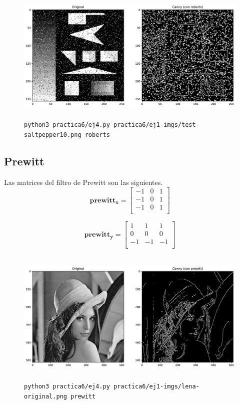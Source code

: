 \documentclass[11pt, spanish]{article}
\begin{document}
\begin{figure}[H]
\centering
    \includegraphics[height=6.5cm]{informe-imgs/ej4-roberts-test-saltpepper10.jpg}
    \caption{\texttt{python3 practica6/ej4.py practica6/ej1-imgs/test-saltpepper10.png roberts}}
\end{figure}


\newpage
\subsection{Prewitt}
Las matrices del filtro de Prewitt son las siguientes.
\[
\mathbf{prewitt_x} = \begin{bmatrix} 
-1 & 0 & 1 \\
-1 & 0 & 1 \\
-1 & 0 & 1 \\
\end{bmatrix}
\]

\[
\mathbf{prewitt_y} = \begin{bmatrix} 
1 & 1 & 1 \\
0 & 0 & 0 \\
-1 & -1 & -1 \\
\end{bmatrix}
\]

\begin{figure}[H]
\centering
    \includegraphics[height=6.5cm]{informe-imgs/ej4-prewitt-lena-original.jpg}
    \caption{\texttt{python3 practica6/ej4.py practica6/ej1-imgs/lena-original.png prewitt}}
\end{figure}
\end{document}
